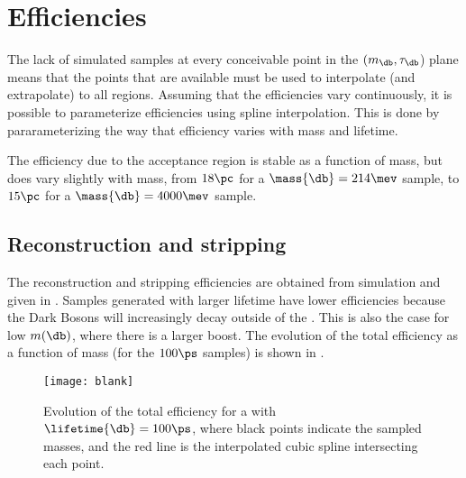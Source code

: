 \section{Efficiencies}
\label{sec:eff}

The lack of simulated samples at every conceivable point in the $(m_\db, \tau_\db$) plane means
that the points that are available must be used to interpolate (and extrapolate) to all regions.
Assuming that the efficiencies vary continuously, it is possible to parameterize efficiencies using
spline interpolation.
This is done by pararameterizing the way that efficiency varies with mass and lifetime.

The efficiency due to the \lhcb acceptance region is stable as a function of mass, but does vary
slightly with mass, from \approx$18\pc$ for a $\mass{\db}=214\mev$ sample, to \approx$15\pc$ for a
$\mass{\db}=4000\mev$ sample.


\subsection{Reconstruction and stripping}
The reconstruction and stripping efficiencies are obtained from simulation and given in
.
Samples generated with larger lifetime have lower efficiencies because the Dark
Bosons will increasingly decay outside of the \velo.
This is also the case for low $m(\db)$, where there is a larger boost.
The evolution of the total efficiency as a function of mass (for the $100\ps$ samples) is shown in
.






\begin{figure}
  \begin{center}
    \texttt{[image: blank]}
    \caption{
      Evolution of the total efficiency for a \db with $\lifetime{\db}=100\ps$, where
      black points indicate the sampled masses, and the red line is the interpolated cubic spline
      intersecting each point.
    }
    \label{fig:eff:spline}
  \end{center}
\end{figure}

